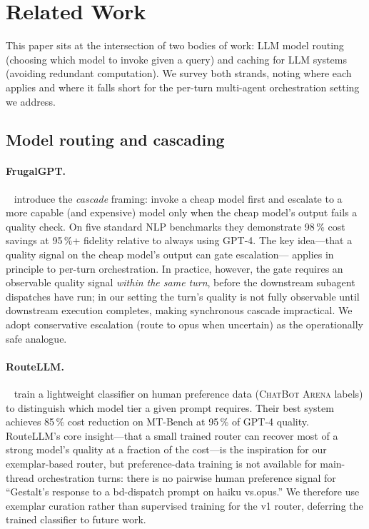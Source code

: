 \section{Related Work}
\label{sec:related}

This paper sits at the intersection of two bodies of work: LLM model
routing (choosing which model to invoke given a query) and caching for
LLM systems (avoiding redundant computation). We survey both strands,
noting where each applies and where it falls short for the per-turn
multi-agent orchestration setting we address.

\subsection{Model routing and cascading}
\label{sec:related-routing}

\paragraph{FrugalGPT.}
\citeauthor{frugalgpt}~\cite{frugalgpt} introduce the
\emph{cascade} framing: invoke a cheap model first and escalate
to a more capable (and expensive) model only when the cheap
model's output fails a quality check. On five standard NLP
benchmarks they demonstrate 98\,\% cost savings at 95\,\%+
fidelity relative to always using GPT-4. The key idea---that a
quality signal on the cheap model's output can gate escalation---
applies in principle to per-turn orchestration. In practice,
however, the gate requires an observable quality signal
\emph{within the same turn}, before the downstream subagent
dispatches have run; in our setting the turn's quality is
not fully observable until downstream execution completes, making
synchronous cascade impractical. We adopt conservative escalation
(route to opus when uncertain) as the operationally safe
analogue.

\paragraph{RouteLLM.}
\citeauthor{routellm}~\cite{routellm} train a lightweight
classifier on human preference data (\textsc{ChatBot Arena}
labels) to distinguish which model tier a given prompt requires.
Their best system achieves 85\,\% cost reduction on MT-Bench at
95\,\% of GPT-4 quality. RouteLLM's core insight---that a small
trained router can recover most of a strong model's quality at
a fraction of the cost---is the inspiration for our exemplar-based
router, but preference-data training is not available for
main-thread orchestration turns: there is no pairwise human
preference signal for ``Gestalt's response to a bd-dispatch prompt
on haiku vs.\@ opus.'' We therefore use exemplar curation rather
than supervised training for the v1 router, deferring the trained
classifier to future work.

